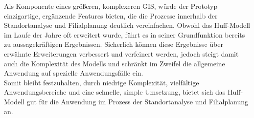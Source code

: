 Als Komponente eines größeren, komplexeren GIS, würde der Prototyp einzigartige, ergänzende Features bieten, die die Prozesse innerhalb der Standortanalyse und Filialplanung deutlich vereinfachen.
Obwohl das Huff-Modell im Laufe der Jahre oft erweitert wurde, führt es in seiner Grundfunktion bereits zu aussagekräftigen Ergebnissen.
Sicherlich können diese Ergebnisse über erwähnte Erweiterungen verbessert und verfeinert werden, jedoch steigt damit auch die Komplexität des Modells und schränkt im Zweifel die allgemeine Anwendung auf spezielle Anwendungsfälle ein.\\
Somit bleibt festzuhalten, durch niedrige Komplexität, vielfältige   Anwendungsbereiche und eine schnelle, simple Umsetzung, bietet sich das Huff-Modell gut für die Anwendung im Prozess der Standortanalyse und Filialplanung an.
